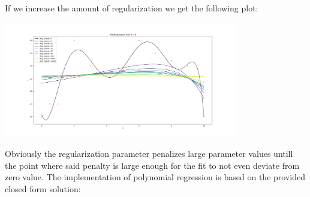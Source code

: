 \documentclass{article}
\newcommand{\1}{\mathbf{1}}
\begin{document}
If we increase the amount of regularization we get the following plot:
\begin{center}
    \includegraphics[width=4in]{HW1/HW1_plots/PolyFitRegularization.png}
\end{center} 
Obviously the regularization parameter penalizes large parameter values untill the point where said penalty is large enough for the fit to not even deviate from zero value. The implementation of polynomial regression is based on the provided closed form solution:
\end{document}
